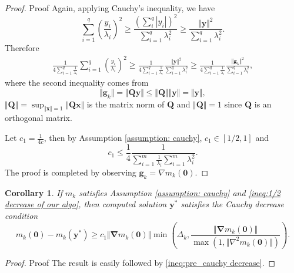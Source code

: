 \documentclass[colorlinks=true, linkcolor=blue, citecolor=blue, urlcolor=blue]{article}
\theoremstyle{plain}
\newtheorem{corollary}[theorem]{Corollary}
\theoremstyle{definition}
\theoremstyle{remark}
\begin{document}
\begin{proof}{Proof}
Again, applying Cauchy's inequality, we have
\begin{equation*}
    \sum_{i=1}^q \left(\frac{y_i}{\lambda_i}\right)^2\geq \frac{(\sum_i^q|y_i|)^2}{\sum_{i=1}^q\lambda_i^2}\geq \frac{\Vert\bm y\Vert^2}{\sum_{i=1}^q\lambda_i^2}.
\end{equation*} 
Therefore
\begin{equation*}
\begin{aligned}
    \frac{1}{4\sum_{i=1}^q\frac{1}{\lambda_i}}\sum_{i=1}^q \left(\frac{y_i}{\lambda_i}\right)^2\geq \frac{1}{4\sum_{i=1}^q\frac{1}{\lambda_i}}\frac{\Vert\bm y\Vert^2}{\sum_{i=1}^q\lambda_i^2}\geq \frac{1}{4\sum_{i=1}^q\frac{1}{\lambda_i}}\frac{\Vert\bm g_k\Vert^2}{\sum_{i=1}^q\lambda_i^2},
\end{aligned}  
\end{equation*}
where the second inequality comes from 
\begin{equation*}
    \Vert \bm g_k\Vert=\Vert\bm Q\bm y\Vert\leq \Vert\bm Q\Vert\Vert\bm y\Vert=\Vert\bm y\Vert,
\end{equation*}
$\Vert\bm Q\Vert=\sup_{\Vert\bm x\Vert=1}\Vert\bm Q\bm x\Vert$ is the matrix norm of $\bm Q$ and $\Vert\bm Q\Vert=1$ since $\bm Q$ is an orthogonal matrix. 

Let $c_1=\frac{1}{4c}$, then by Assumption \ref{assumption: cauchy}, $c_1\in[1/2,1]$ and 
\begin{equation*}
     c_1\leq\frac{1}{4}\frac{1}{\sum_{i=1}^m\frac{1}{\lambda_i}\sum_{i=1}^m\lambda_i^2}.
\end{equation*}
The proof is completed by observing $\bm g_k=\nabla m_k(\bm 0)$.  
\end{proof}

\begin{corollary}\label{cor: cauchy decrease, cor of thm 9}
    If $m_k$ satisfies Assumption \ref{assumption: cauchy} and \eqref{ineq:1/2 decrease of our algo}, then computed solution $\bm y^*$ satisfies the Cauchy decrease condition
    \begin{equation*}
        m_k(\bm 0)-m_k(\bm y^*)\geq c_1\Vert\bm \nabla m_k(\bm 0)\Vert\min\left(\Delta_k,\frac{\Vert\bm \nabla m_k(\bm 0)\Vert}{\max(1,\Vert \nabla^2m_k(\bm 0)\Vert)}\right).
    \end{equation*}
\end{corollary}

\begin{proof}{Proof}
    The result is easily followed by \eqref{ineq:pre_cauchy decrease}.  
\end{proof}
\end{document}
